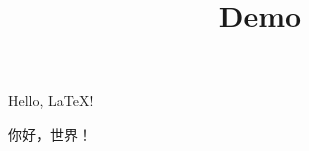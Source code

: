 \documentclass{article}
\title{Demo}
\begin{document}
\maketitle

Hello, LaTeX!

你好，世界！
\end{document}
